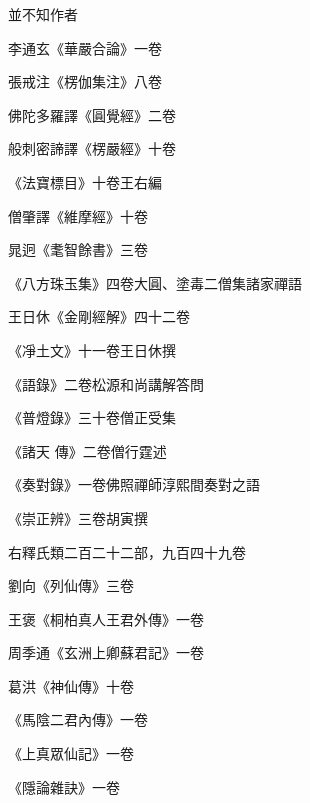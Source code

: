 \begin{pinyinscope}
 並不知作者



 李通玄《華嚴合論》一卷



 張戒注《楞伽集注》八卷



 佛陀多羅譯《圓覺經》二卷



 般刺密諦譯《楞嚴經》十卷



 《法寶標目》十卷王右編



 僧肇譯《維摩經》十卷



 晁迥《耄智餘書》三卷



 《八方珠玉集》四卷大圓、塗毒二僧集諸家禪語



 王日休《金剛經解》四十二卷



 《凈土文》十一卷王日休撰



 《語錄》二卷松源和尚講解答問



 《普燈錄》三十卷僧正受集



 《諸天
 傳》二卷僧行霆述



 《奏對錄》一卷佛照禪師淳熙間奏對之語



 《崇正辨》三卷胡寅撰



 右釋氏類二百二十二部，九百四十九卷



 劉向《列仙傳》三卷



 王褒《桐柏真人王君外傳》一卷



 周季通《玄洲上卿蘇君記》一卷



 葛洪《神仙傳》十卷



 《馬陰二君內傳》一卷



 《上真眾仙記》一卷



 《隱論雜訣》一卷




\end{pinyinscope}
